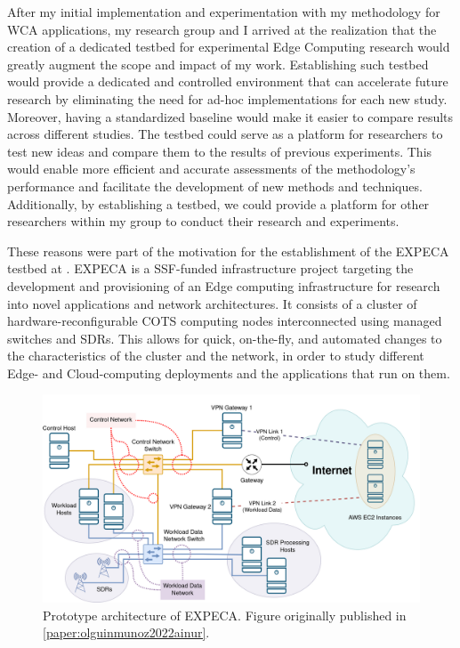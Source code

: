 After my initial implementation and experimentation with my methodology for \gls{WCA} applications, my research group and I arrived at the realization that the creation of a dedicated testbed for experimental Edge Computing research would greatly augment the scope and impact of my work.
Establishing such testbed would provide a dedicated and controlled environment that can accelerate future research by eliminating the need for ad-hoc implementations for each new study.
Moreover, having a standardized baseline would make it easier to compare results across different studies.
The testbed could serve as a platform for researchers to test new ideas and compare them to the results of previous experiments.
This would enable more efficient and accurate assessments of the methodology's performance and facilitate the development of new methods and techniques.
Additionally, by establishing a testbed, we could provide a platform for other researchers within my group to conduct their research and experiments.

These reasons were part of the motivation for the establishment of the \gls{EXPECA} testbed at .
\gls{EXPECA} is a \gls{SSF}-funded infrastructure project targeting the development and provisioning of an Edge computing infrastructure for research into novel applications and network architectures.
It consists of a cluster of hardware-reconfigurable \gls{COTS} computing nodes interconnected using managed switches and \glspl{SDR}.
This allows for quick, on-the-fly, and automated changes to the characteristics of the cluster and the network, in order to study different Edge- and Cloud-computing deployments and the applications that run on them.

\begin{figure}
    \centering
    \includegraphics[width=.9\textwidth]{publications/2022Ainur/figures/network}
    \caption{
        Prototype architecture of \acs{EXPECA}.
        Figure originally published in \cref{paper:olguinmunoz2022ainur}.
    }\label{fig:expeca}
\end{figure}

